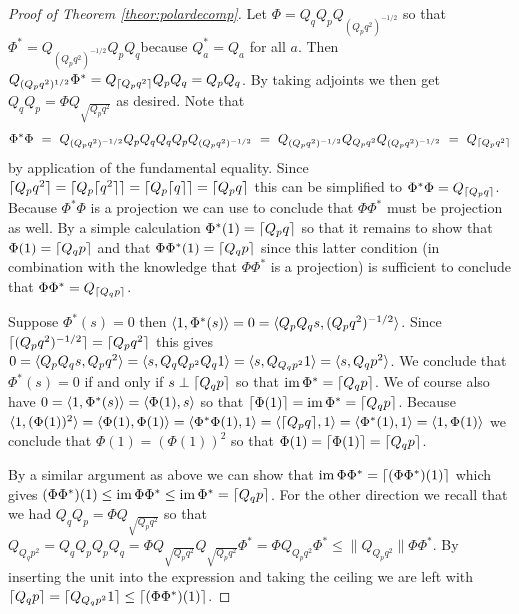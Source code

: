 \documentclass[submission,copyright,creativecommons]{eptcs}
\newcounter{main}
\theoremstyle{definition}
\DeclarePairedDelimiter{\ceil}{\lceil}{\rceil}
\DeclarePairedDelimiter{\inn}{\langle}{\rangle}
\DeclareMathOperator{\im}{im}
\begin{document}
\begin{proof}[Proof of Theorem \ref{theor:polardecomp}]
	Let $\Phi = Q_qQ_pQ_{(Q_p q^2)^{-1/2}}$ so that $\Phi^* = Q_{(Q_p q^2)^{-1/2}}Q_pQ_q$because $Q_a^*=Q_a$ for all $a$. Then $Q_{(Q_p q^2)^{1/2}}\Phi^* = Q_{\ceil{Q_pq^2}}Q_pQ_q = Q_p Q_q$. By taking adjoints we then get $Q_qQ_p = \Phi Q_{\sqrt{Q_p q^2}}$ as desired. Note that 
	\begin{equation*}
	\Phi^*\Phi  \ =\  Q_{(Q_p q^2)^{-1/2}}Q_pQ_qQ_qQ_pQ_{(Q_p
	q^2)^{-1/2}} \ =\  Q_{(Q_p q^2)^{-1/2}} Q_{Q_p q^2} Q_{(Q_p
	q^2)^{-1/2}} \ =\  Q_{\ceil{Q_p q^2}}
	\end{equation*}
	by application of the fundamental equality. Since $\ceil{Q_p q^2} = \ceil{Q_p \ceil{q^2}} = \ceil{Q_p \ceil{q}} = \ceil{Q_p q}$ this can be simplified to $\Phi^*\Phi = Q_{\ceil{Q_p q}}$.  Because $\Phi^*\Phi$ is a projection we can use \cite[Proposition 6.1.1]{kadison2015fundamentals} to conclude that $\Phi\Phi^*$ must be projection as well. By a simple calculation $\Phi^*(1) = \ceil{Q_p q}$ so that it remains to show that $\Phi(1) = \ceil{Q_q p}$ and that $\Phi\Phi^*(1)=\ceil{Q_q p}$ since this latter condition (in combination with the knowledge that $\Phi\Phi^*$ is a projection) is sufficient to conclude that $\Phi\Phi^* = Q_{\ceil{Q_q p}}$.

	Suppose $\Phi^*(s)=0$ then $\inn{1,\Phi^*(s)} = 0 = \inn{Q_pQ_q s, (Q_p q^2)^{-1/2}}$. Since $\ceil{(Q_p q^2)^{-1/2}} = \ceil{Q_p q^2}$ this gives $0=\inn{Q_pQ_q s, Q_p q^2} = \inn{s, Q_qQ_{p^2}Q_q 1} = \inn{s, Q_{Q_q p^2}1} = \inn{s, Q_q p^2}$. We conclude that $\Phi^*(s)=0$ if and only if $s\perp \ceil{Q_q p}$ so that $\im{\Phi^*} = \ceil{Q_q p}$. We of course also have $0=\inn{1,\Phi^*(s)} = \inn{\Phi(1),s}$ so that $\ceil{\Phi(1)} = \im{\Phi^*}= \ceil{Q_q p}$. Because $\inn{1,(\Phi(1))^2} = \inn{\Phi(1),\Phi(1)} = \inn{\Phi^*\Phi(1),1} = \inn{\ceil{Q_p q}, 1} = \inn{\Phi^*(1),1} = \inn{1,\Phi(1)}$ we conclude that $\Phi(1)=(\Phi(1))^2$ so that $\Phi(1)=\ceil{\Phi(1)} = \ceil{Q_q p}$. 

	By a similar argument as above we can show that
	$\im{\Phi\Phi^*}=\ceil{(\Phi\Phi^*)(1)}$ which gives
	$(\Phi\Phi^*)(1) \leq \im{\Phi\Phi^*} \leq \im{\Phi^*} =
	\ceil{Q_q p}$. For the other direction we recall that we
	had $Q_q Q_p = \Phi Q_{\sqrt{Q_pq^2}}$ so that $Q_{Q_qp^2}
	= Q_q Q_p Q_p Q_q = \Phi Q_{\sqrt{Q_pq^2}}Q_{\sqrt{Q_pq^2}}\Phi^*
	= \Phi Q_{Q_pq^2}\Phi^* \leq \| Q_{Q_pq^2} \|\Phi\Phi^*$.
	By inserting the unit into the expression and taking the
	ceiling we are left with $\ceil{Q_qp} = \ceil{Q_{Q_qp^2}1}
	\leq \ceil{(\Phi\Phi^*)(1)}$.
\end{proof}
\end{document}

